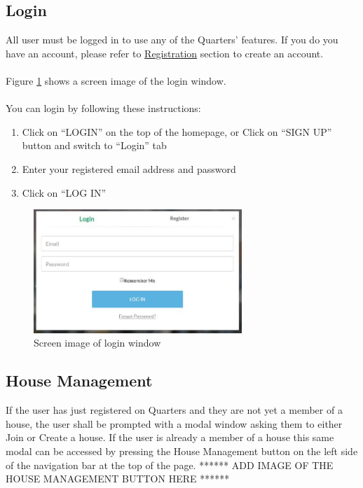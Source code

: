 \documentclass[12pt]{article}
\begin{document}
    \subsection{Login}
    All user must be logged in to use any of the Quarters' features. If you do you have an account, please refer to \hyperref[sec:registration]{Registration} section to create an account. \\\\
    Figure \ref{fig:login} shows a screen image of the login window.\\\\
    You can login by following these instructions:
    \begin{enumerate}
        \item Click on ``LOGIN'' on the top of the homepage, or Click on ``SIGN UP'' button and switch to ``Login'' tab
        \item Enter your registered email address and password
        \item Click on ``LOG IN''
    \end{enumerate}
    \begin{figure}
        \centering
        \includegraphics[width=0.7\textwidth]{login}
        \caption{Screen image of login window}
        \label{fig:login}
    \end{figure}
    \subsection{House Management} %
    \label{sec:housemanagement}
    If the user has just registered on Quarters and they are not yet a member of a house, the user shall be prompted with a modal window asking them to either Join or Create a house. If the user is already a member of a house this same modal can be accessed by pressing the House Management button on the  left side of the navigation bar at the top of the page. ****** ADD IMAGE OF THE HOUSE MANAGEMENT BUTTON HERE ******
\end{document}
